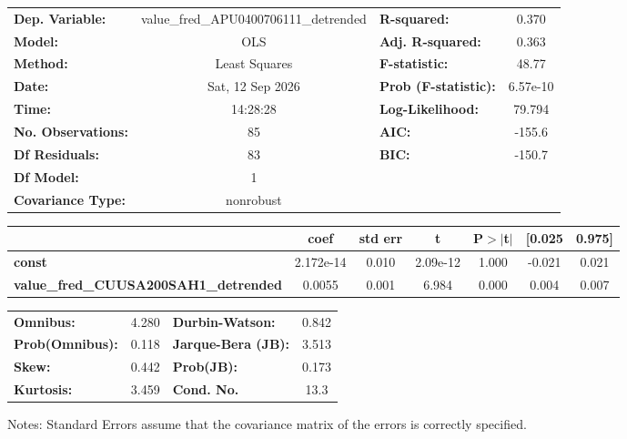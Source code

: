 \begin{center}
\begin{tabular}{lclc}
\toprule
\textbf{Dep. Variable:}                       & value\_fred\_APU0400706111\_detrended & \textbf{  R-squared:         } &     0.370   \\
\textbf{Model:}                               &                  OLS                  & \textbf{  Adj. R-squared:    } &     0.363   \\
\textbf{Method:}                              &             Least Squares             & \textbf{  F-statistic:       } &     48.77   \\
\textbf{Date:}                                &            Sat, 12 Sep 2026           & \textbf{  Prob (F-statistic):} &  6.57e-10   \\
\textbf{Time:}                                &                14:28:28               & \textbf{  Log-Likelihood:    } &    79.794   \\
\textbf{No. Observations:}                    &                     85                & \textbf{  AIC:               } &    -155.6   \\
\textbf{Df Residuals:}                        &                     83                & \textbf{  BIC:               } &    -150.7   \\
\textbf{Df Model:}                            &                      1                & \textbf{                     } &             \\
\textbf{Covariance Type:}                     &               nonrobust               & \textbf{                     } &             \\
\bottomrule
\end{tabular}
\begin{tabular}{lcccccc}
                                              & \textbf{coef} & \textbf{std err} & \textbf{t} & \textbf{P$> |$t$|$} & \textbf{[0.025} & \textbf{0.975]}  \\
\midrule
\textbf{const}                                &    2.172e-14  &        0.010     &  2.09e-12  &         1.000        &       -0.021    &        0.021     \\
\textbf{value\_fred\_CUUSA200SAH1\_detrended} &       0.0055  &        0.001     &     6.984  &         0.000        &        0.004    &        0.007     \\
\bottomrule
\end{tabular}
\begin{tabular}{lclc}
\textbf{Omnibus:}       &  4.280 & \textbf{  Durbin-Watson:     } &    0.842  \\
\textbf{Prob(Omnibus):} &  0.118 & \textbf{  Jarque-Bera (JB):  } &    3.513  \\
\textbf{Skew:}          &  0.442 & \textbf{  Prob(JB):          } &    0.173  \\
\textbf{Kurtosis:}      &  3.459 & \textbf{  Cond. No.          } &     13.3  \\
\bottomrule
\end{tabular}
\end{center}

Notes: \newline
 [1] Standard Errors assume that the covariance matrix of the errors is correctly specified.